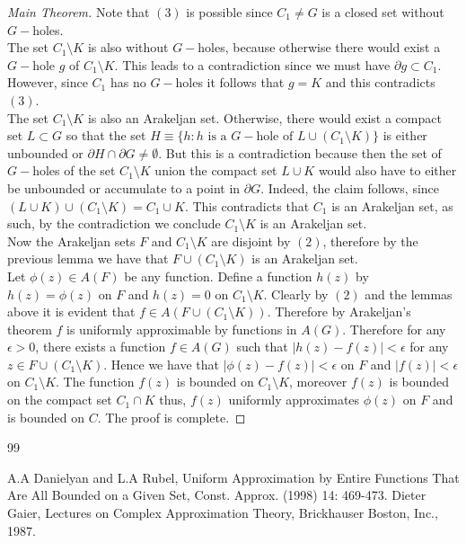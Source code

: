 \documentclass[12pt]{article}
\begin{document}
\begin{proof}[Main Theorem]
\noindent Note that $(3)$ is possible since $C_1\not=G$ is a closed set without $G-$holes.\\
 The set $C_1\setminus K$ is also without $G-$holes, because otherwise there would exist a $G-$hole $g$ of $C_1\setminus K$. This leads to a contradiction since we must have $\partial g\subset C_1$. However, since $C_1$ has no $G-$holes it follows that $g=K$ and this contradicts $(3)$.\\
 The set $C_1\setminus K$ is also an Arakeljan set. Otherwise, there would exist a compact set $L\subset G$ so that the set $H\equiv \lbrace h: h \text{ is a }G-\text{hole of }L\cup(C_1\setminus K)\rbrace$ is either unbounded or $\partial H\cap \partial G\not=\emptyset$. But this is a contradiction because then the set of $G-$holes of the set $C_1\setminus K$ union the compact set $L\cup K$ would also have to either be unbounded or accumulate to a point in $\partial G$. Indeed, the claim follows, since $(L\cup K)\cup (C_1\setminus K)=C_1\cup K$. This contradicts that $C_1$ is an Arakeljan set, as such, by the contradiction we conclude $C_1\setminus K$ is an Arakeljan set.\\
 Now the Arakeljan sets $F$ and $C_1\setminus K$ are disjoint by $(2)$, therefore by the previous lemma we have that $F\cup (C_1\setminus K)$ is an Arakeljan set. \\
 Let $\phi(z)\in A(F)$ be any function. Define a function $h(z)$ by $h(z)=\phi(z)$ on $F$ and $h(z)=0$ on $C_1\setminus K$. Clearly by $(2)$ and the lemmas above it is evident that $f\in A(F\cup (C_1\setminus K))$. Therefore by Arakeljan's theorem $f$ is uniformly approximable by functions in $A(G)$. Therefore for any $\epsilon>0$, there exists a function $f\in A(G)$ such that $|h(z)-f(z)|<\epsilon$ for any $z\in F\cup (C_1\setminus K)$. Hence we have that $|\phi(z)-f(z)|<\epsilon$ on $F$ and $|f(z)|<\epsilon$ on $C_1\setminus K$. The function $f(z)$ is bounded on $C_1\setminus K$, moreover $f(z)$ is bounded on the compact set $C_1\cap K$ thus, $f(z)$ uniformly approximates $\phi(z)$ on $F$ and is bounded on $C$. The proof is complete.
\end{proof}

\pagebreak

\begin{thebibliography}{99}

 A.A Danielyan and L.A Rubel, Uniform Approximation by Entire Functions That Are All Bounded on a Given Set, Const. Approx. (1998) 14: 469-473.
 Dieter Gaier, Lectures on Complex Approximation Theory, Brickhauser Boston, Inc., 1987.

\end{thebibliography}
\end{document}
